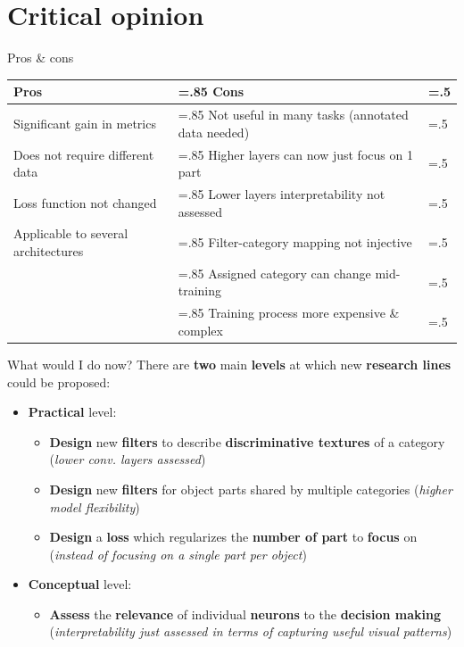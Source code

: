 \documentclass{beamer}
\begin{document}
\section{Critical opinion}

\begin{frame}{Pros \& cons}
    \begin{table}[ht]
    \centering
    \begin{tabularx}{\linewidth}{@{}X>{\hsize=.85\hsize}X>{\hsize=.5\hsize}X@{}}
    \toprule
    \textbf{Pros} & \textbf{Cons} \\ \midrule
    Significant gain in metrics & Not useful in many tasks (annotated data needed) \\
    Does not require different data & Higher layers can now just focus on 1 part \\
    Loss function not changed & Lower layers interpretability not assessed \\
    Applicable to several architectures & Filter-category mapping not injective \\
     & Assigned category can change mid-training \\
     & Training process more expensive \& complex \\
    \bottomrule
    \end{tabularx}
    \end{table}
\end{frame}

\begin{frame}{What would I do now?}
    There are \textbf{two} main \textbf{levels} at which new \textbf{research lines} could be proposed:
    \begin{itemize}
        \item \textbf{Practical} level:
        \begin{itemize}
            \item \textbf{Design} new \textbf{filters} to describe \textbf{discriminative textures} of a category (\textit{lower conv. layers assessed}) %
            \item \textbf{Design} new \textbf{filters} for object parts shared by multiple categories (\textit{higher model flexibility}) %
            \item \textbf{Design} a \textbf{loss} which regularizes the \textbf{number of part} to \textbf{focus} on (\textit{instead of focusing on a single part per object})
        \end{itemize}
        \item \textbf{Conceptual} level:
        \begin{itemize}
            \item \textbf{Assess} the \textbf{relevance} of individual \textbf{neurons} to the \textbf{decision making} (\textit{interpretability just assessed in terms of capturing useful visual patterns})
        \end{itemize}
    \end{itemize}
\end{frame}
\end{document}
